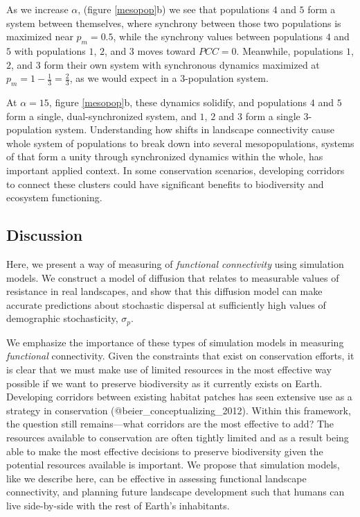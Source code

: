 As we increase \(\alpha\), (figure \ref{mesopop}b) we see that
populations \(4\) and \(5\) form a system between themselves, where
synchrony between those two populations is maximized near \(p_m=0.5\),
while the synchrony values between populations \(4\) and \(5\) with
populations \(1\), \(2\), and \(3\) moves toward \(PCC =0\). Meanwhile,
populations \(1\), \(2\), and \(3\) form their own system with
synchronous dynamics maximized at \(p_m = 1-\frac{1}{3}= \frac{2}{3}\),
as we would expect in a \(3\)-population system.

At \(\alpha = 15\), figure \ref{mesopop}b, these dynamics solidify, and
populations \(4\) and \(5\) form a single, dual-synchronized system, and
\(1\), \(2\) and \(3\) form a single \(3\)-population system.
Understanding how shifts in landscape connectivity cause whole system of
populations to break down into several mesopopulations, systems of that
form a unity through synchronized dynamics within the whole, has
important applied context. In some conservation scenarios, developing
corridors to connect these clusters could have significant benefits to
biodiversity and ecosystem functioning.

\hypertarget{discussion}{%
\subsection{Discussion}\label{discussion}}

Here, we present a way of measuring of \emph{functional connectivity}
using simulation models. We construct a model of diffusion that relates
to measurable values of resistance in real landscapes, and show that
this diffusion model can make accurate predictions about stochastic
dispersal at sufficiently high values of demographic stochasticity,
\(\sigma_p\).

We emphasize the importance of these types of simulation models in
measuring \emph{functional} connectivity. Given the constraints that
exist on conservation efforts, it is clear that we must make use of
limited resources in the most effective way possible if we want to
preserve biodiversity as it currently exists on Earth. Developing
corridors between existing habitat patches has seen extensive use as a
strategy in conservation (@beier\_conceptualizing\_2012). Within this
framework, the question still remains---what corridors are the most
effective to add? The resources available to conservation are often
tightly limited and as a result being able to make the most effective
decisions to preserve biodiversity given the potential resources
available is important. We propose that simulation models, like we
describe here, can be effective in assessing functional landscape
connectivity, and planning future landscape development such that humans
can live side-by-side with the rest of Earth's inhabitants.

\pagebreak
